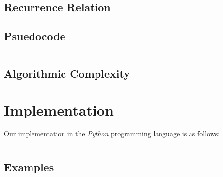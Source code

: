 \documentclass[titlepage,12pt]{article}
\begin{document}

\subsection{Recurrence Relation}


\subsection{Psuedocode}

\inputminted{python3}{dp.py}

\subsection{Algorithmic Complexity}


\section{Implementation}

Our implementation in the \emph{Python} programming language is as follows:

\inputminted{python3}{dp.py}

\subsection{Examples}


\end{document}
